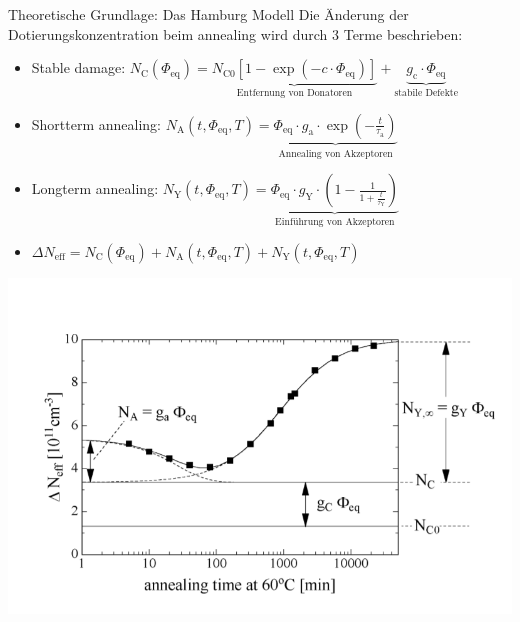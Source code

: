 \documentclass[aspectratio=1610, 9pt]{beamer}
\begin{document}
\begin{frame}{Theoretische Grundlage: Das Hamburg Modell}
  Die Änderung der Dotierungskonzentration beim annealing wird durch 3 Terme beschrieben:
  \medskip
  \begin{itemize}
    \item Stable damage:\: $N_{\mathrm{C}}(\Phi_{\mathrm{eq}}) = \underbrace{ N_{\mathrm{C0}}[1-\exp{(-c \cdot \Phi_{\mathrm{eq}})}] }_{\text{Entfernung von Donatoren}} + \underbrace{ g_{\mathrm{c}} \cdot \Phi_{\mathrm{eq}} }_{\text{stabile Defekte}}$
    \medskip
    \item Shortterm annealing:\: $N_{\mathrm{A}}(t, \Phi_{\mathrm{eq}}, T)= \underbrace{ \Phi_{\mathrm{eq}} \cdot g_{\mathrm{a}} \cdot \exp{(-\frac{t}{\tau_{\mathrm{a}}})} }_{\text{Annealing von Akzeptoren}}$
    \medskip
    \item Longterm annealing:\: $N_{\mathrm{Y}}(t, \Phi_{\mathrm{eq}}, T)= \underbrace{\Phi_{\mathrm{eq}} \cdot g_{\mathrm{Y}} \cdot \left(1-\frac{1}{1+\frac{t}{\tau_{\mathrm{Y}}}}\right)}_{\text{Einführung von Akzeptoren}}$
    \medskip

    \item   $\Delta N_{\mathrm{eff}} = N_{\mathrm{C}}(\Phi_{\mathrm{eq}}) + N_{\mathrm{A}}(t, \Phi_{\mathrm{eq}}, T) + N_{\mathrm{Y}}(t, \Phi_{\mathrm{eq}}, T)$
  \end{itemize}
  \hfill
  \begin{minipage}[b]{0.35\linewidth}
    \vspace{-3cm} \hspace{-1.5cm}
  \includegraphics[height=12\baselineskip]{images/n_eff_beispiel.png}
  \end{minipage}
\end{frame}
\end{document}

